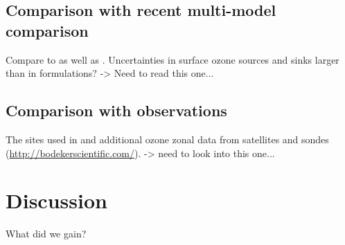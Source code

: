 \documentclass[gmd, manuscript]{copernicus}
\begin{document}
\subsection{Comparison with recent multi-model comparison}
\label{subsec:model}
Compare to \citet{ACP:Hardacre2015} as well as \citet{ACP:Luhar2017}. \citep{AE:Derwent2018} Uncertainties in surface ozone sources and sinks larger than in formulations? -> Need to read this one...
\subsection{Comparison with observations}
\label{subsec:obs}
The sites used in \citet{ACP:Hardacre2015} and additional ozone zonal data from satellites and sondes (\url{http://bodekerscientific.com/}). \citep{AE:Hu2017} -> need to look into this one...
\section{Discussion}
\label{sec:disc}





\conclusions  %
\label{sec:conc}
What did we gain?








\end{document}
